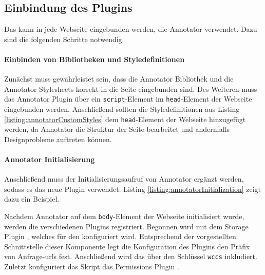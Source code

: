 \subsection{Einbindung des Plugins}
    \label{section:solutionDetailsAnnotatorPluginIntegration}
    Das {\annotatorPlugin} kann in jede Webseite eingebunden werden,
    die Annotator verwendet.
    Dazu sind die folgenden Schritte notwendig.

    \paragraph{Einbinden von Bibliotheken und Styledefinitionen}
    Zunächst muss gewährleistet sein, dass die
    Annotator Bibliothek
    und die Annotator Stylesheets
    \cite[Kapitel "`Getting started with Annotator"']{annotator:documentation}
    korrekt in die Seite eingebunden sind.
    Des Weiteren muss das Annotator Plugin über ein \texttt{script}-Element
    im \texttt{head}-Element der Webseite eingebunden werden.
    Anschließend sollten die Styledefinitionen aus Listing \ref{listing:annotatorCustomStyles}
    dem \texttt{head}-Element der Webseite hinzugefügt werden,
    da Annotator die Struktur der Seite bearbeitet und andernfalls Designprobleme auftreten können.

    

    \paragraph{Annotator Initialisierung}
    Anschließend muss der Initialisierungsaufruf von Annotator ergänzt werden,
    sodass es das neue Plugin verwendet.
    Listing \ref{listing:annotatorInitialization} zeigt dazu ein Beispiel.

    

    Nachdem Annotator auf dem \texttt{body}-Element der Webseite initialisiert wurde,
    werden die verschiedenen Plugins registriert.
    Begonnen wird mit dem
    Storage Plugin \cite[Kapitel "`Plugins"']{annotator:documentation},
    welches für den {\annotationService} konfiguriert wird.
    Entsprechend der vorgestellten Schnittstelle dieser
    Komponente
    legt die Konfiguration des Plugins den Präfix von Anfrage-\glspl{url} fest.
    Anschließend wird das {\annotatorPlugin} über den Schlüssel \texttt{wccs} inkludiert.
    Zuletzt konfiguriert das Skript das
    Permissions Plugin \cite[Kapitel "`Plugins"']{annotator:documentation}.

